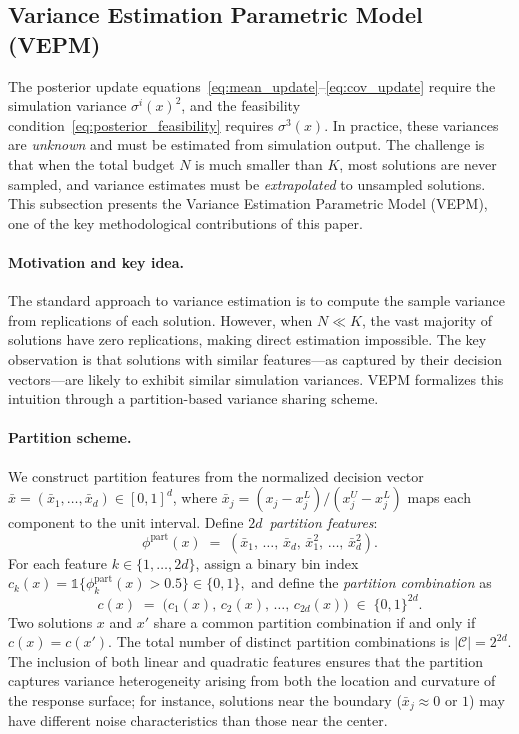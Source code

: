 \documentclass[12pt]{article}
\theoremstyle{plain}
\theoremstyle{definition}
\theoremstyle{remark}
\begin{document}
\subsection{Variance Estimation Parametric Model (VEPM)}\label{subsec:VEPM}

The posterior update equations~\eqref{eq:mean_update}--\eqref{eq:cov_update} require the simulation variance $\sigma^i(x)^2$, and the feasibility condition~\eqref{eq:posterior_feasibility} requires $\sigma^3(x)$. In practice, these variances are \emph{unknown} and must be estimated from simulation output. The challenge is that when the total budget $N$ is much smaller than $K$, most solutions are never sampled, and variance estimates must be \emph{extrapolated} to unsampled solutions. This subsection presents the Variance Estimation Parametric Model (VEPM), one of the key methodological contributions of this paper.

\paragraph{Motivation and key idea.}
The standard approach to variance estimation is to compute the sample variance from replications of each solution. However, when $N \ll K$, the vast majority of solutions have zero replications, making direct estimation impossible. The key observation is that solutions with similar features---as captured by their decision vectors---are likely to exhibit similar simulation variances. VEPM formalizes this intuition through a partition-based variance sharing scheme.

\paragraph{Partition scheme.}
We construct partition features from the normalized decision vector $\bar{x} = (\bar{x}_1, \ldots, \bar{x}_d) \in [0,1]^d$, where $\bar{x}_j = (x_j - x_j^L)/(x_j^U - x_j^L)$ maps each component to the unit interval. Define $2d$~\emph{partition features}:
\[
  \phi^{\mathrm{part}}(x) \;=\; (\bar{x}_1,\, \ldots,\, \bar{x}_d,\, \bar{x}_1^2,\, \ldots,\, \bar{x}_d^2).
\]
For each feature $k \in \{1, \ldots, 2d\}$, assign a binary bin index
$c_k(x) = \mathbb{1}\{\phi^{\mathrm{part}}_k(x) > 0.5\} \in \{0, 1\},$
and define the \emph{partition combination} as
\begin{equation}\label{eq:partition_combination}
  c(x) \;=\; \bigl(c_1(x),\, c_2(x),\, \ldots,\, c_{2d}(x)\bigr) \;\in\; \{0,1\}^{2d}.
\end{equation}
Two solutions $x$ and $x'$ share a common partition combination if and only if $c(x) = c(x')$. The total number of distinct partition combinations is $|\mathcal{C}| = 2^{2d}$.
The inclusion of both linear and quadratic features ensures that the partition captures variance heterogeneity arising from both the location and curvature of the response surface; for instance, solutions near the boundary ($\bar{x}_j \approx 0$ or $1$) may have different noise characteristics than those near the center.
\end{document}
